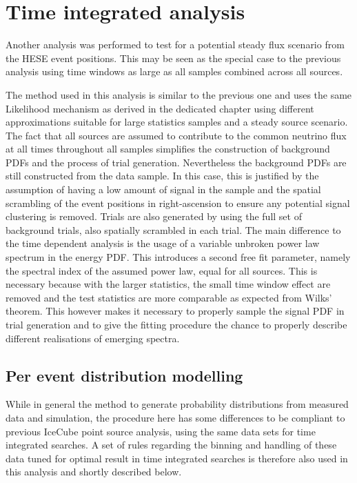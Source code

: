 \chapter{Time integrated analysis}

Another analysis was performed to test for a potential steady flux scenario from the HESE event positions.
This may be seen as the special case to the previous analysis using time windows as large as all samples combined across all sources.


The method used in this analysis is similar to the previous one and uses the same Likelihood mechanism as derived in the dedicated chapter using different approximations suitable for large statistics samples and a steady source scenario.
The fact that all sources are assumed to contribute to the common neutrino flux at all times throughout all samples simplifies the construction of background PDFs and the process of trial generation.
Nevertheless the background PDFs are still constructed from the data sample.
In this case, this is justified by the assumption of having a low amount of signal in the sample and the spatial scrambling of the event positions in right-ascension to ensure any potential signal clustering is removed.
Trials are also generated by using the full set of background trials, also spatially scrambled in each trial.
The main difference to the time dependent analysis is the usage of a variable unbroken power law spectrum in the energy PDF.
This introduces a second free fit parameter, namely the spectral index of the assumed power law, equal for all sources.
This is necessary because with the larger statistics, the small time window effect are removed and the test statistics are more comparable as expected from Wilks' theorem.
This however makes it necessary to properly sample the signal PDF in trial generation and to give the fitting procedure the chance to properly describe different realisations of emerging spectra.

\section{Per event distribution modelling}
While in general the method to generate probability distributions from measured data and simulation, the procedure here has some differences to be compliant to previous IceCube point source analysis, using the same data sets for time integrated searches.
A set of rules regarding the binning and handling of these data tuned for optimal result in time integrated searches is therefore also used in this analysis and shortly described below.

